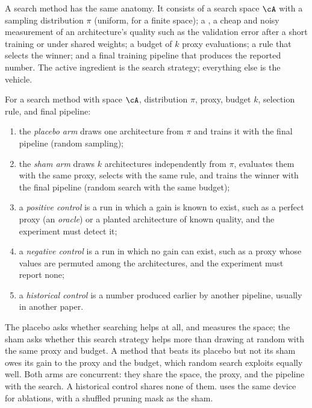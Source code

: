 \begin{refsection}
A search method has the same anatomy. It consists of a search space $\cA$ with a sampling distribution $\pi$ (uniform, for a finite space); a , a cheap and noisy measurement of an architecture's quality such as the validation error after a short training or under shared weights; a budget of $k$ proxy evaluations; a rule that selects the winner; and a final training pipeline that produces the reported number. The active ingredient is the search strategy; everything else is the vehicle.

\begin{definition}\label{def:controls:controls}
For a search method with space $\cA$, distribution $\pi$, proxy, budget $k$, selection rule, and final pipeline:
\begin{enumerate}
\item the \emph{placebo arm} draws one architecture from $\pi$ and trains it with the final pipeline (random sampling);
\item the \emph{sham arm} draws $k$ architectures independently from $\pi$, evaluates them with the same proxy, selects with the same rule, and trains the winner with the final pipeline (random search with the same budget);
\item a \emph{positive control} is a run in which a gain is known to exist, such as a perfect proxy (an \emph{oracle}) or a planted architecture of known quality, and the experiment must detect it;
\item a \emph{negative control} is a run in which no gain can exist, such as a proxy whose values are permuted among the architectures, and the experiment must report none;
\item a \emph{historical control} is a number produced earlier by another pipeline, usually in another paper.
\end{enumerate}
\end{definition}

The placebo asks whether searching helps at all, and measures the space; the sham asks whether this search strategy helps more than drawing at random with the same proxy and budget. A method that beats its placebo but not its sham owes its gain to the proxy and the budget, which random search exploits equally well. Both arms are concurrent: they share the space, the proxy, and the pipeline with the search. A historical control shares none of them.  uses the same device for ablations, with a shuffled pruning mask as the sham.


\end{refsection}

